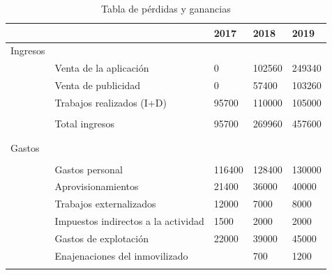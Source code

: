 \documentclass[11pt,leqno]{article}
\begin{document}
\begin{table}[H]
\centering
\caption{Tabla de pérdidas y ganancias}
\label{PyG}
\begin{tabular}{@{}lllll@{}}
\toprule
                    &                                     & 2017   & 2018   & 2019   \\ \midrule
Ingresos            &                                     &        &        &        \\
                    & Venta de la aplicación              & 0      & 102560 & 249340 \\
                    & Venta de publicidad                 & 0      & 57400  & 103260 \\
                    & Trabajos realizados (I+D)           & 95700  & 110000 & 105000 \\
                    &                                     &        &        &        \\
                    & Total ingresos                      & 95700  & 269960 & 457600 \\
                    &                                     &        &        &        \\
                    &                                     &        &        &        \\
Gastos              &                                     &        &        &        \\
                    &                                     &        &        &        \\
                    & Gastos personal                     & 116400 & 128400 & 130000 \\
                    & Aprovisionamientos                  & 21400  & 36000  & 40000  \\
                    & Trabajos externalizados             & 12000  & 7000   & 8000   \\
                    & Impuestos indirectos a la actividad & 1500   & 2000   & 2000   \\
                    & Gastos de explotación               & 22000  & 39000  & 45000  \\
                    & Enajenaciones del inmovilizado      &        & 700    & 1200   \\
                    &                                     &        &        &        \\

\end{tabular}
\end{table}
\end{document}
